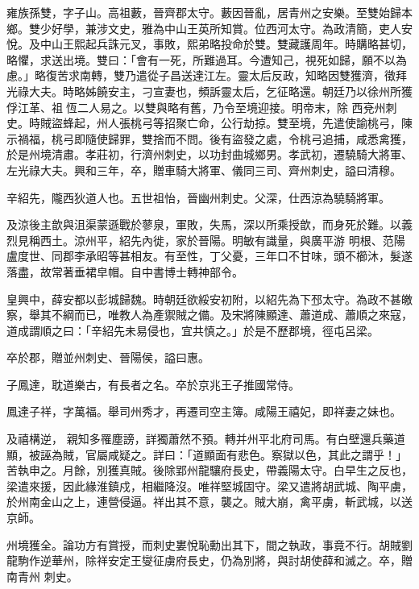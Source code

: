 \begin{pinyinscope}
 雍族孫雙，字子山。高祖藪，晉齊郡太守。藪因晉亂，居青州之安樂。至雙始歸本鄉。雙少好學，兼涉文史，雅為中山王英所知賞。位西河太守。為政清簡，吏人安悅。及中山王熙起兵誅元叉，事敗，熙弟略投命於雙。雙藏護周年。時購略甚切，略懼，求送出境。雙曰：「會有一死，所難過耳。今遭知己，視死如歸，願不以為慮。」略復苦求南轉，雙乃遣從子昌送達江左。靈太后反政，知略因雙獲濟，徵拜光祿大夫。時略姊饒安主，刁宣妻也，頻訴靈太后，乞征略還。朝廷乃以徐州所獲俘江革、祖恆二人易之。以雙與略有舊，乃令至境迎接。明帝末，除
 西兗州刺史。時賊盜蜂起，州人張桃弓等招聚亡命，公行劫掠。雙至境，先遣使諭桃弓，陳示禍福，桃弓即隨使歸罪，雙捨而不問。後有盜發之處，令桃弓追捕，咸悉禽獲，於是州境清肅。孝莊初，行濟州刺史，以功封曲城鄉男。孝武初，遷驍騎大將軍、左光祿大夫。興和三年，卒，贈車騎大將軍、儀同三司、齊州刺史，謚曰清穆。



 辛紹先，隴西狄道人也。五世祖怡，晉幽州刺史。父深，仕西涼為驍騎將軍。



 及涼後主歆與沮渠蒙遜戰於蓼泉，軍敗，失馬，深以所乘授歆，而身死於難。以義烈見稱西土。涼州平，紹先內徙，家於晉陽。明敏有識量，與廣平游
 明根、范陽盧度世、同郡李承昭等甚相友。有至性，丁父憂，三年口不甘味，頭不櫛沐，髮遂落盡，故常著垂裙皁帽。自中書博士轉神部令。



 皇興中，薛安都以彭城歸魏。時朝廷欲綏安初附，以紹先為下邳太守。為政不甚皦察，舉其不綱而已，唯教人為產禦賊之備。及宋將陳顯達、蕭道成、蕭順之來寇，道成謂順之曰：「辛紹先未易侵也，宜共慎之。」於是不歷郡境，徑屯呂梁。



 卒於郡，贈並州刺史、晉陽侯，謚曰惠。



 子鳳達，耽道樂古，有長者之名。卒於京兆王子推國常侍。



 鳳達子祥，字萬福。舉司州秀才，再遷司空主簿。咸陽王禧妃，即祥妻之妹也。



 及禧構逆，
 親知多罹塵謗，詳獨蕭然不預。轉并州平北府司馬。有白壁還兵藥道顯，被誣為賊，官屬咸疑之。詳曰：「道顯面有悲色。察獄以色，其此之謂乎！」苦執申之。月餘，別獲真賊。後除郢州龍驤府長史，帶義陽太守。白早生之反也，梁遣來援，因此緣淮鎮戍，相繼降沒。唯祥堅城固守。梁又遣將胡武城、陶平虜，於州南金山之上，連營侵逼。祥出其不意，襲之。賊大崩，禽平虜，斬武城，以送京師。



 州境獲全。論功方有賞授，而刺史婁悅恥勳出其下，間之執政，事竟不行。胡賊劉龍駒作逆華州，除祥安定王燮征虜府長史，仍為別將，與討胡使薛和滅之。卒，贈南青州
 刺史。




\end{pinyinscope}
